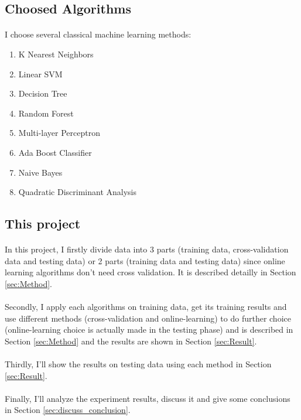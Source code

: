 \documentclass{gapd}
\begin{document}
	
\subsection{Choosed Algorithms}
\paragraph{}
	I choose several classical machine learning methods: 
	\begin{enumerate}
		\item K Nearest Neighbors
		\item Linear SVM
		\item Decision Tree
		\item Random Forest
		\item Multi-layer Perceptron
		\item Ada Boost Classifier
		\item Naive Bayes
		\item Quadratic Discriminant Analysis
	\end{enumerate}
	

\subsection{This project}
\paragraph{}
	In this project, I firstly divide data into 3 parts (training data, cross-validation data and testing data) or 2 parts (training data and testing data) since online learning algorithms don't need cross validation. It is described detailly in Section \ref{sec:Method}. 
\paragraph{}
	Secondly, I apply each algorithms on training data, get its training results and use different methods (cross-validation and online-learning) to do further choice (online-learning choice is actually made in the testing phase) and is described in Section \ref{sec:Method} and the results are shown in Section \ref{sec:Result}. 
\paragraph{}
	Thirdly, I'll show the results on testing data using each method in Section \ref{sec:Result}. 
\paragraph{}
	Finally, I'll analyze the experiment results, discuss it and give some conclusions in Section \ref{sec:discuss_conclusion}. 
\end{document}
